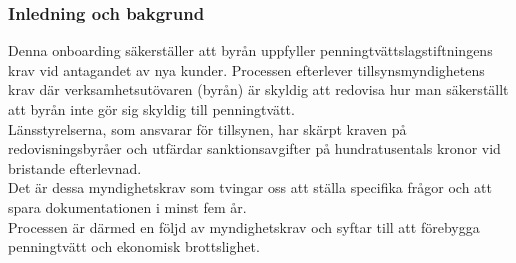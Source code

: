 \documentclass[10pt]{beamer}
\begin{document}
\begin{frame}[label=intro]
  \frametitle{Inledning och bakgrund}

  \small
  Denna onboarding säkerställer att byrån uppfyller penningtvättslagstiftningens krav vid antagandet av nya kunder. Processen efterlever tillsynsmyndighetens krav där verksamhetsutövaren (byrån) är skyldig att redovisa hur man säkerställt att byrån inte gör sig skyldig till penningtvätt.\\
  Länsstyrelserna, som ansvarar för tillsynen, har skärpt kraven på redovisningsbyråer och utfärdar sanktionsavgifter på hundratusentals kronor vid bristande efterlevnad.\\
  Det är dessa myndighetskrav som tvingar oss att ställa specifika frågor och att spara dokumentationen i minst fem år.\\
  Processen är därmed en följd av myndighetskrav och syftar till att förebygga penningtvätt och ekonomisk brottslighet.

  \vspace{1.2cm}
  \begin{flushright}
    \hyperlink{nextslide}{}
  \end{flushright}
\end{frame}

\end{document}
